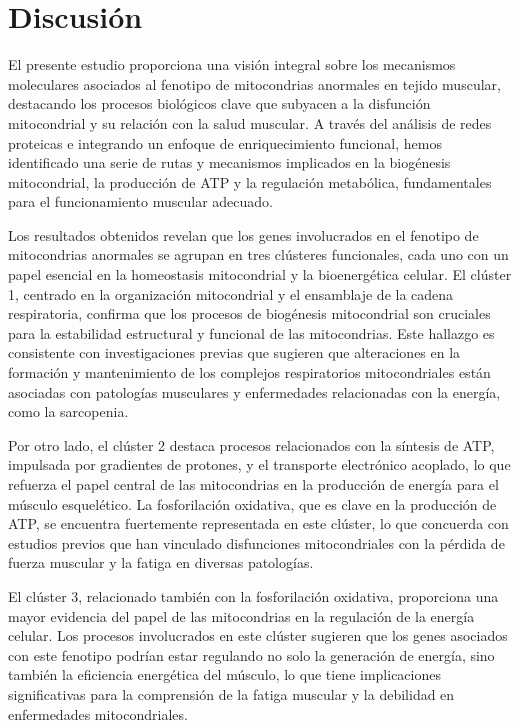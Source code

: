 \section{Discusión}

El presente estudio proporciona una visión integral sobre los mecanismos moleculares asociados al fenotipo de mitocondrias anormales en tejido muscular, destacando los procesos biológicos clave que subyacen a la disfunción mitocondrial y su relación con la salud muscular. A través del análisis de redes proteicas e integrando un enfoque de enriquecimiento funcional, hemos identificado una serie de rutas y mecanismos implicados en la biogénesis mitocondrial, la producción de ATP y la regulación metabólica, fundamentales para el funcionamiento muscular adecuado.

Los resultados obtenidos revelan que los genes involucrados en el fenotipo de mitocondrias anormales se agrupan en tres clústeres funcionales, cada uno con un papel esencial en la homeostasis mitocondrial y la bioenergética celular. El clúster 1, centrado en la organización mitocondrial y el ensamblaje de la cadena respiratoria, confirma que los procesos de biogénesis mitocondrial son cruciales para la estabilidad estructural y funcional de las mitocondrias. Este hallazgo es consistente con investigaciones previas que sugieren que alteraciones en la formación y mantenimiento de los complejos respiratorios mitocondriales están asociadas con patologías musculares y enfermedades relacionadas con la energía, como la sarcopenia.

Por otro lado, el clúster 2 destaca procesos relacionados con la síntesis de ATP, impulsada por gradientes de protones, y el transporte electrónico acoplado, lo que refuerza el papel central de las mitocondrias en la producción de energía para el músculo esquelético. La fosforilación oxidativa, que es clave en la producción de ATP, se encuentra fuertemente representada en este clúster, lo que concuerda con estudios previos que han vinculado disfunciones mitocondriales con la pérdida de fuerza muscular y la fatiga en diversas patologías.

El clúster 3, relacionado también con la fosforilación oxidativa, proporciona una mayor evidencia del papel de las mitocondrias en la regulación de la energía celular. Los procesos involucrados en este clúster sugieren que los genes asociados con este fenotipo podrían estar regulando no solo la generación de energía, sino también la eficiencia energética del músculo, lo que tiene implicaciones significativas para la comprensión de la fatiga muscular y la debilidad en enfermedades mitocondriales.

